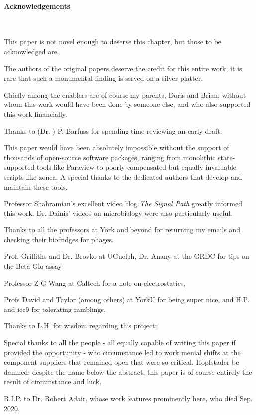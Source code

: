 \documentclass[paper.tex]{subfiles}
\begin{document}
	
\clearpage
\paragraph{Acknowledgements}\

This paper is not novel enough to deserve this chapter, but those to be acknowledged are.

The authors of the original papers deserve the credit for this entire work; it is rare that such a monumental finding is served on a silver platter.

Chiefly among the enablers are of course my parents, Doris and Brian, without whom this work would have been done by someone else, and who also supported this work financially. 

Thanks to (Dr. ) P. Barfuss for spending time reviewing an early draft.

This paper would have been absolutely impossible without the support of thousands of open-source software packages, ranging from monolithic state-supported tools like Paraview to poorly-compensated but equally invaluable scripts like zonca. A special thanks to the dedicated authors that develop and maintain these tools.

Professor Shahramian's excellent video blog {\it The Signal Path} greatly informed this work. Dr. Dainis' videos on microbiology were also particularly useful.

Thanks to all the professors at York and beyond for returning my emails and checking their biofridges for phages.

Prof. Griffiths and Dr. Brovko at UGuelph, Dr. Anany at the GRDC for tips on the Beta-Glo assay

Professor Z-G Wang at Caltech for a note on electrostatics, 

Profs David and Taylor (among others) at YorkU for being super nice, and H.P. and ice9 for tolerating ramblings.

Thanks to L.H. for wisdom regarding this project; 

Special thanks to all the people - all equally capable of writing this paper if provided the opportunity - who circumstance led to work menial shifts at the component suppliers that remained open that were so critical. Hopfstader be damned; despite the name below the abstract, this paper is of course entirely the result of circumstance and luck. 

R.I.P. to Dr. Robert Adair, whose work features prominently here, who died Sep. 2020. 
\end{document}
